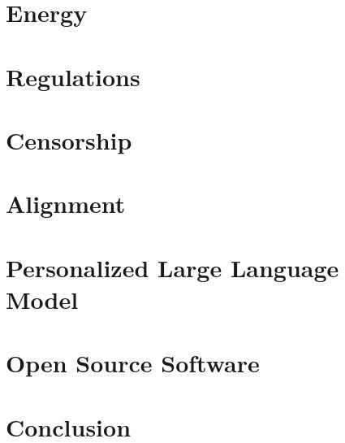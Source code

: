 \documentclass[
]{book}
\begin{document}
\hypertarget{energy}{%
\chapter{Energy}\label{energy}}

\hypertarget{regulations}{%
\chapter{Regulations}\label{regulations}}

\hypertarget{censorship}{%
\chapter{Censorship}\label{censorship}}

\hypertarget{alignment}{%
\chapter{Alignment}\label{alignment}}

\hypertarget{personalized-large-language-model}{%
\chapter{Personalized Large Language Model}\label{personalized-large-language-model}}

\hypertarget{open-source-software}{%
\chapter{Open Source Software}\label{open-source-software}}

\hypertarget{conclusion}{%
\chapter{Conclusion}\label{conclusion}}

  
\end{document}

